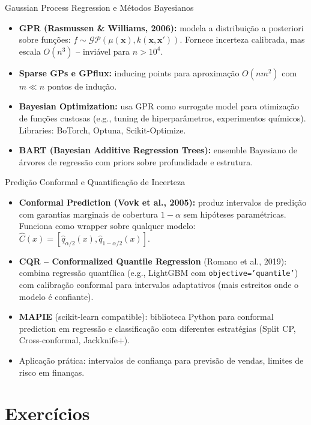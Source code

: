 \documentclass[12pt,a4paper]{article}
\begin{document}
\begin{estadoartebox}{Gaussian Process Regression e Métodos Bayesianos}
\begin{itemize}
  \item \textbf{GPR (Rasmussen \& Williams, 2006):} modela a distribuição a posteriori sobre funções: $f \sim \mathcal{GP}(\mu(\mathbf{x}), k(\mathbf{x},\mathbf{x}'))$. Fornece incerteza calibrada, mas escala $O(n^3)$ -- inviável para $n > 10^4$.
  \item \textbf{Sparse GPs e GPflux:} inducing points para aproximação $O(nm^2)$ com $m \ll n$ pontos de indução.
  \item \textbf{Bayesian Optimization:} usa GPR como surrogate model para otimização de funções custosas (e.g., tuning de hiperparâmetros, experimentos químicos). Libraries: BoTorch, Optuna, Scikit-Optimize.
  \item \textbf{BART (Bayesian Additive Regression Trees):} ensemble Bayesiano de árvores de regressão com priors sobre profundidade e estrutura.
\end{itemize}
\end{estadoartebox}

\begin{estadoartebox}{Predição Conformal e Quantificação de Incerteza}
\begin{itemize}
  \item \textbf{Conformal Prediction (Vovk et al., 2005):} produz intervalos de predição com garantias marginais de cobertura $1-\alpha$ sem hipóteses paramétricas. Funciona como wrapper sobre qualquer modelo: $\hat{C}(x) = [\hat{q}_{\alpha/2}(x), \hat{q}_{1-\alpha/2}(x)]$.
  \item \textbf{CQR -- Conformalized Quantile Regression} (Romano et al., 2019): combina regressão quantílica (e.g., LightGBM com \texttt{objective='quantile'}) com calibração conformal para intervalos adaptativos (mais estreitos onde o modelo é confiante).
  \item \textbf{MAPIE} (scikit-learn compatible): biblioteca Python para conformal prediction em regressão e classificação com diferentes estratégias (Split CP, Cross-conformal, Jackknife+).
  \item Aplicação prática: intervalos de confiança para previsão de vendas, limites de risco em finanças.
\end{itemize}
\end{estadoartebox}

\section{Exercícios}
\end{document}
